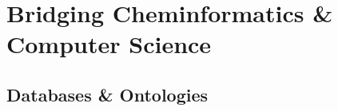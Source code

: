 \documentclass{sig-alternate}
\begin{document}
\section{Bridging Cheminformatics \& Computer Science}
\label{sec:bridg-chem-}

\subsection{Databases \& Ontologies}
\label{sec:datab--ontol}


  
  
\end{document}
